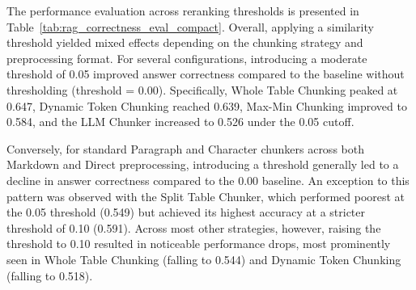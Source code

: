 \documentclass[12pt]{article} %
\begin{document}
The performance evaluation across reranking thresholds is presented in Table~\ref{tab:rag_correctness_eval_compact}. Overall, applying a similarity threshold yielded mixed effects depending on the chunking strategy and preprocessing format. For several configurations, introducing a moderate threshold of 0.05 improved answer correctness compared to the baseline without thresholding (threshold = 0.00). Specifically, Whole Table Chunking peaked at 0.647, Dynamic Token Chunking reached 0.639, Max-Min Chunking improved to 0.584, and the LLM Chunker increased to 0.526 under the 0.05 cutoff.

Conversely, for standard Paragraph and Character chunkers across both Markdown and Direct preprocessing, introducing a threshold generally led to a decline in answer correctness compared to the 0.00 baseline. An exception to this pattern was observed with the Split Table Chunker, which performed poorest at the 0.05 threshold (0.549) but achieved its highest accuracy at a stricter threshold of 0.10 (0.591). Across most other strategies, however, raising the threshold to 0.10 resulted in noticeable performance drops, most prominently seen in Whole Table Chunking (falling to 0.544) and Dynamic Token Chunking (falling to 0.518).
\end{document}
